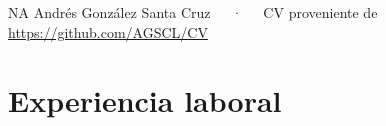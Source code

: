 \documentclass[11pt,a4paper,]{awesome-cv}
\begin{document}
\makecvheader

\makecvfooter
  {NA}
    {Andrés González Santa Cruz~~~·~~~CV proveniente de
\href{hhttps://github.com/AGSCL/CV}{https://github.com/AGSCL/CV}}
  {\thepage}





\hypertarget{experiencia-laboral}{%
\section{Experiencia laboral}\label{experiencia-laboral}}
\end{document}
